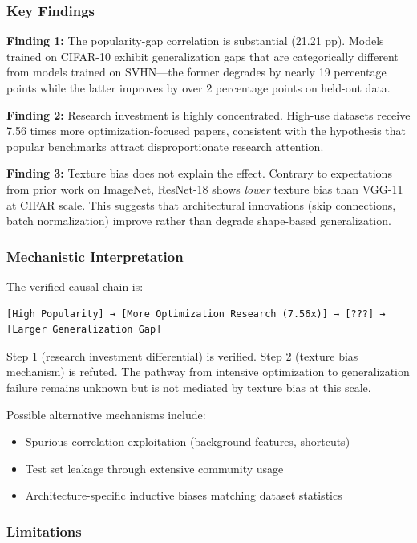 
\subsubsection{Key Findings}

\textbf{Finding 1:} The popularity-gap correlation is substantial (21.21 pp). Models trained on CIFAR-10 exhibit generalization gaps that are categorically different from models trained on SVHN---the former degrades by nearly 19 percentage points while the latter improves by over 2 percentage points on held-out data.

\textbf{Finding 2:} Research investment is highly concentrated. High-use datasets receive 7.56 times more optimization-focused papers, consistent with the hypothesis that popular benchmarks attract disproportionate research attention.

\textbf{Finding 3:} Texture bias does not explain the effect. Contrary to expectations from prior work on ImageNet, ResNet-18 shows \textit{lower} texture bias than VGG-11 at CIFAR scale. This suggests that architectural innovations (skip connections, batch normalization) improve rather than degrade shape-based generalization.

\subsubsection{Mechanistic Interpretation}

The verified causal chain is:

\begin{verbatim}
[High Popularity] → [More Optimization Research (7.56x)] → [???] → [Larger Generalization Gap]
\end{verbatim}

Step 1 (research investment differential) is verified. Step 2 (texture bias mechanism) is refuted. The pathway from intensive optimization to generalization failure remains unknown but is not mediated by texture bias at this scale.

Possible alternative mechanisms include:
\begin{itemize}
\item Spurious correlation exploitation (background features, shortcuts)
\item Test set leakage through extensive community usage
\item Architecture-specific inductive biases matching dataset statistics
\end{itemize}

\subsubsection{Limitations}


